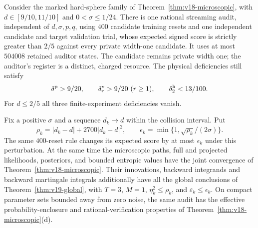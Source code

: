 \begin{theorem}
\label{thm:v19-composition}
Consider the marked hard-sphere family of
Theorem~\ref{thm:v18-microscopic}, with $d\in[9/10,11/10]$ and
$0<\sigma\le1/24$. There is one rational streaming audit, independent of
$d,\sigma,p,q$, using $400$ candidate training resets and one independent
candidate and target validation trial, whose expected signed score is
strictly greater than $2/5$ against every private width-one candidate.
It uses at most $504008$ retained auditor states. The candidate remains
private width one; the auditor's register is a distinct, charged resource.
The physical deficiencies still satisfy
\[
 \dpr>9/20,\qquad \dvi_r>9/20\ (r\ge1),\qquad \dhi_2<13/100.
\]
For $d\le2/5$ all three finite-experiment deficiencies vanish.

Fix a positive $\sigma$ and a sequence $d_k\to d$ within the collision
interval. Put
\[
 \rho_k=|d_k-d|+2700|d_k-d|^2,\qquad
 \epsilon_k=\min\{1,\sqrt{\rho_k}/(2\sigma)\}.
\]
The same $400$-reset rule changes its expected score by at most
$\epsilon_k$ under this perturbation. At the same time the microscopic
paths, full and projected likelihoods, posteriors, and bounded entropic
values have the joint convergence of
Theorem~\ref{thm:v18-microscopic}. Their innovations, backward integrands
and backward martingale integrals additionally have all the global
conclusions of Theorem~\ref{thm:v19-global}, with $T=3$, $M=1$,
$\eta_k^2\le\rho_k$, and $\varepsilon_k\le\epsilon_k$.
On compact parameter sets bounded away from zero noise, the same audit
has the effective probability-enclosure and rational-verification
properties of Theorem~\ref{thm:v18-microscopic}(d).
\end{theorem}

